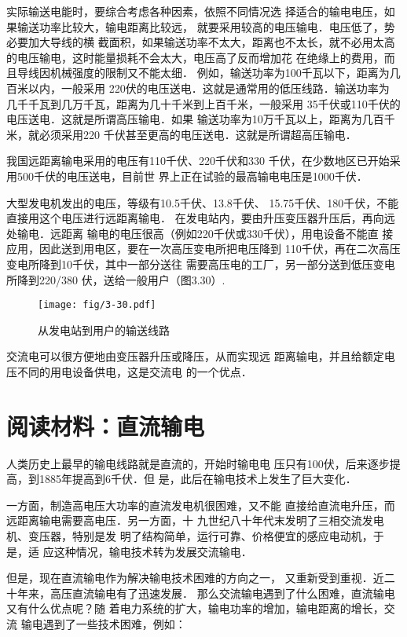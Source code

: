 实际输送电能时，要综合考虑各种因素，依照不同情况选
择适合的输电电压，如果输送功率比较大，输电距离比较远，
就要采用较高的电压输电．电压低了，势必要加大导线的横
截面积，如果输送功率不太大，距离也不太长，就不必用太高
的电压输电，这时能量损耗不会太大，电压高了反而增加花
在绝缘上的费用，而且导线因机械强度的限制又不能太细．
例如，输送功率为100千瓦以下，距离为几百米以内，一般采用
220伏的电压送电．这就是通常用的低压线路．输送功率为
几千千瓦到几万千瓦，距离为几十千米到上百千米，一般采用
35千伏或110千伏的电压送电．这就是所谓高压输电．如果
输送功率为10万千瓦以上，距离为几百千米，就必须采用220
千伏甚至更高的电压送电．这就是所谓超高压输电．

我国远距离输电采用的电压有110千伏、220千伏和330
千伏，在少数地区已开始采用500千伏的电压送电，目前世
界上正在试验的最高输电电压是1000千伏．

大型发电机发出的电压，等级有10.5千伏、13.8千伏、
15.75千伏、180千伏，不能直接用这个电压进行远距离输电．
在发电站内，要由升压变压器升压后，再向远处输电．远距离
输电的电压很高（例如220千伏或330千伏），用电设备不能直
接应用，因此送到用电区，要在一次高压变电所把电压降到
110千伏，再在二次高压变电所降到10千伏，其中一部分送往
需要高压电的工厂，另一部分送到低压变电所降到220/380
伏，送给一般用户（图3.30）.
\begin{figure}[htp]\centering
    \texttt{[image: fig/3-30.pdf]}
    \caption{从发电站到用户的输送线路}
    \end{figure}

交流电可以很方便地由变压器升压或降压，从而实现远
距离输电，并且给额定电压不同的用电设备供电，这是交流电
的一个优点．

\section*{阅读材料：直流输电}
人类历史上最早的输电线路就是直流的，开始时输电电
压只有100伏，后来逐步提高，到1885年提高到6千伏．但
是，此后在输电技术上发生了巨大变化．

一方面，制造高电压大功率的直流发电机很困难，又不能
直接给直流电升压，而远距离输电需要高电压．另一方面，十
九世纪八十年代末发明了三相交流发电机、变压器，特别是发
明了结构简单，运行可靠、价格便宜的感应电动机，于是，适
应这种情况，输电技术转为发展交流输电．

但是，现在直流输电作为解决输电技术困难的方向之一，
又重新受到重视．近二十年来，高压直流输电有了迅速发展．
那么交流输电遇到了什么困难，直流输电又有什么优点呢？随
着电力系统的扩大，输电功率的增加，输电距离的增长，交流
输电遇到了一些技术困难，例如：

